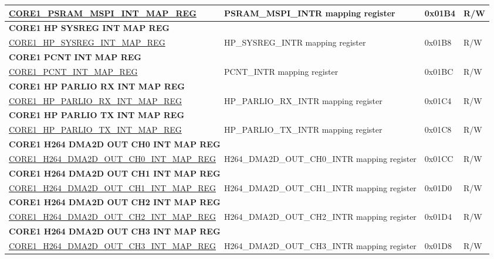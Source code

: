 \begin{longtable}{ | p{7.5cm} | p{7.2cm} | p{1.3cm} | p{1cm} | }
\hyperref[regdesc:CORE1PSRAMMSPIINTMAPREG]{CORE1\_PSRAM\_MSPI\_INT\_MAP\_REG} & PSRAM\_MSPI\_INTR mapping register & 0x01B4 & R/W \\ \hline
\multicolumn{4}{|l|}{\textbf{CORE1 HP SYSREG INT MAP REG}} \\ \hline
\hyperref[regdesc:CORE1HPSYSREGINTMAPREG]{CORE1\_HP\_SYSREG\_INT\_MAP\_REG} & HP\_SYSREG\_INTR mapping register & 0x01B8 & R/W \\ \hline
\multicolumn{4}{|l|}{\textbf{CORE1 PCNT INT MAP REG}} \\ \hline
\hyperref[regdesc:CORE1PCNTINTMAPREG]{CORE1\_PCNT\_INT\_MAP\_REG} & PCNT\_INTR mapping register & 0x01BC & R/W \\ \hline
\multicolumn{4}{|l|}{\textbf{CORE1 HP PARLIO RX INT MAP REG}} \\ \hline
\hyperref[regdesc:CORE1HPPARLIORXINTMAPREG]{CORE1\_HP\_PARLIO\_RX\_INT\_MAP\_REG} & HP\_PARLIO\_RX\_INTR mapping register & 0x01C4 & R/W \\ \hline
\multicolumn{4}{|l|}{\textbf{CORE1 HP PARLIO TX INT MAP REG}} \\ \hline
\hyperref[regdesc:CORE1HPPARLIOTXINTMAPREG]{CORE1\_HP\_PARLIO\_TX\_INT\_MAP\_REG} & HP\_PARLIO\_TX\_INTR mapping register & 0x01C8 & R/W \\ \hline
\multicolumn{4}{|l|}{\textbf{CORE1 H264 DMA2D OUT CH0 INT MAP REG}} \\ \hline
\hyperref[regdesc:CORE1H264DMA2DOUTCH0INTMAPREG]{CORE1\_H264\_DMA2D\_OUT\_CH0\_INT\_MAP\_REG} & H264\_DMA2D\_OUT\_CH0\_INTR mapping register & 0x01CC & R/W \\ \hline
\multicolumn{4}{|l|}{\textbf{CORE1 H264 DMA2D OUT CH1 INT MAP REG}} \\ \hline
\hyperref[regdesc:CORE1H264DMA2DOUTCH1INTMAPREG]{CORE1\_H264\_DMA2D\_OUT\_CH1\_INT\_MAP\_REG} & H264\_DMA2D\_OUT\_CH1\_INTR mapping register & 0x01D0 & R/W \\ \hline
\multicolumn{4}{|l|}{\textbf{CORE1 H264 DMA2D OUT CH2 INT MAP REG}} \\ \hline
\hyperref[regdesc:CORE1H264DMA2DOUTCH2INTMAPREG]{CORE1\_H264\_DMA2D\_OUT\_CH2\_INT\_MAP\_REG} & H264\_DMA2D\_OUT\_CH2\_INTR mapping register & 0x01D4 & R/W \\ \hline
\multicolumn{4}{|l|}{\textbf{CORE1 H264 DMA2D OUT CH3 INT MAP REG}} \\ \hline
\hyperref[regdesc:CORE1H264DMA2DOUTCH3INTMAPREG]{CORE1\_H264\_DMA2D\_OUT\_CH3\_INT\_MAP\_REG} & H264\_DMA2D\_OUT\_CH3\_INTR mapping register & 0x01D8 & R/W \\ \hline

\end{longtable}
